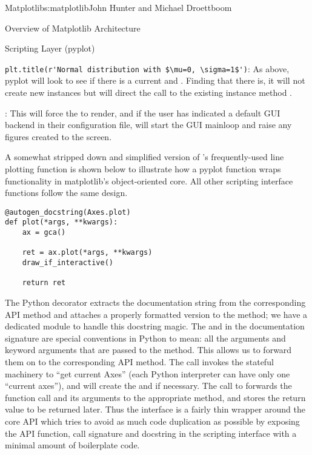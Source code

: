 \begin{aosachapter}{Matplotlib}{s:matplotlib}{John Hunter and Michael Droettboom}
\begin{aosasect1}{Overview of Matplotlib Architecture}
\begin{aosasect2}{Scripting Layer (pyplot)}
\begin{aosaitemize}
\item \verb+plt.title(r'Normal distribution with $\mu=0, \sigma=1$')+:
  As above, pyplot will look to see if there is a
  current  and .  Finding that there is, it
  will not create new instances but will direct the call to the
  existing  instance method .

\item {}: This will force the  to render,
  and if the user has indicated a default GUI backend in their
  configuration file, will start the GUI mainloop and raise any
  figures created to the screen.

\end{aosaitemize}

A somewhat stripped down and simplified version of 's
frequently-used line plotting function 
is shown below to illustrate how a pyplot function wraps functionality
in matplotlib's object-oriented core.  All other  scripting
interface functions follow the same design.

\begin{verbatim}
@autogen_docstring(Axes.plot)
def plot(*args, **kwargs):
    ax = gca()

    ret = ax.plot(*args, **kwargs)
    draw_if_interactive()

    return ret
\end{verbatim}

The Python decorator  extracts
the documentation string from the corresponding API method and
attaches a properly formatted version to the 
method; we have a dedicated module  to
handle this docstring magic.  The  and  in
the documentation signature are special conventions in Python to mean:
all the arguments and keyword arguments that are passed to the method.
This allows us to forward them on to the corresponding API method.
The call  invokes the stateful machinery to ``get
current Axes'' (each Python interpreter can have only one ``current
axes''), and will create the  and  if
necessary.  The call to  forwards
the function call and its arguments to the appropriate 
method, and stores the return value to be returned later.  Thus the
 interface is a fairly thin wrapper around the core
 API which tries to avoid as much code duplication as
possible by exposing the API function, call signature and docstring in
the scripting interface with a minimal amount of boilerplate code.


\end{aosasect2}
\end{aosasect1}
\end{aosachapter}

